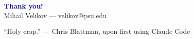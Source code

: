 \documentclass[aspectratio=169, 11pt]{beamer}
\begin{document}
\begin{frame}{}
\vfill
\begin{center}
{\large\bfseries\textcolor{darkblue}{Thank you!}}\\[0.5cm]
\textcolor{medgray}{Mihail Velikov --- velikov@psu.edu}
\end{center}
\vspace{1cm}
\begin{bigquote}
\large
``Holy crap.''
\hfill\textcolor{medgray}{\normalsize --- Chris Blattman, upon first using Claude Code}
\end{bigquote}
\vfill
\end{frame}
\end{document}
